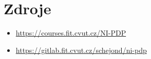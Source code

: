 \documentclass{article} \oddsidemargin=-5mm
\begin{document}
\section{Zdroje}
\begin{itemize}
\item \url{https://courses.fit.cvut.cz/NI-PDP}
\item \url{https://gitlab.fit.cvut.cz/schejond/ni-pdp}
\end{itemize}
\end{document}
